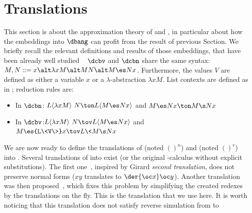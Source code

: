 \section{Translations}\label{sec:translations}
This section is about the approximation theory of \dcbn{} and \dcbv{}, in particular about how the
embeddings into $\dbang$ can profit from the result of previous Section. 
We briefly recall the relevant definitions and results of those embeddings, that have been already well studied  ~\cite{bucciarelli2023bang,kag24,arrial-quantitative,arrial-diligence,agk24d,arrial-genericity}
%
$\dcbv$ and $\dcbn$ share the same syntax:
$M, N ::= x \alt \lambda x M \alt MN \alt M\es Nx$.
%
Furthermore, the values $V$ are defined as either a variable $x$ or a
$\lambda$-abstraction $\lambda x M$. List contexts are defined as in \dbang{}; reduction rules are:
\begin{itemize}
	\item In $\dcbn$: $L\langle \lambda x M \rangle~N \ton L\langle M\es
		Nx\rangle$ and $M\es Nx \ton M\s Nx$
	\item In $\dcbv$:$L\langle \lambda x M \rangle~N \tov L\langle M\es
		Nx\rangle$ and $M\es {L\<V\>}x \tov L\<M\s Nx\>$
\end{itemize}
We are now ready to define the translations of \dcbn{} (noted $()^n$) and 
\dcbv{} (noted $()^v$) into \dbang. Several translations of \dcbv{} into \dbang{} exist (or the original \bang-calculus
without explicit substitutions). The first one~\cite{ehrhard2016bang}, inspired
by Girard \emph{second translation}, does not
preserve normal forms ($xy$ translates to $\der{\oc x}\oc
y$). Another translation was then proposed~\cite{bucciarelli2023bang}, which
fixes this problem by simplifying the created
redexes by the translations on the fly. This is the translation that we use
here. It is worth noticing that this translation does not satisfy reverse
simulation from \dbang{} to \dcbv{}~\cite[Figure 1]{agk24d}
